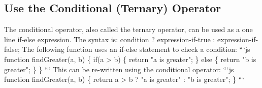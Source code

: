 \documentclass{article}%
\begin{document}
%
\subsection{Use the Conditional (Ternary) Operator}%
\label{subsec:UsetheConditional(Ternary)Operator}%
The conditional operator, also called the ternary operator, can be used as a one line if{-}else expression.\newline%
The syntax is:\newline%
condition ? expression{-}if{-}true : expression{-}if{-}false;\newline%
The following function uses an if{-}else statement to check a condition:\newline%
```js\newline%
function findGreater(a, b) \{\newline%
  if(a > b) \{\newline%
    return "a is greater";\newline%
  \}\newline%
  else \{\newline%
    return "b is greater";\newline%
  \}\newline%
\}\newline%
```\newline%
This can be re{-}written using the conditional operator:\newline%
```js\newline%
function findGreater(a, b) \{\newline%
  return a > b ? "a is greater" : "b is greater";\newline%
\}\newline%
```\newline%

%
\end{document}
